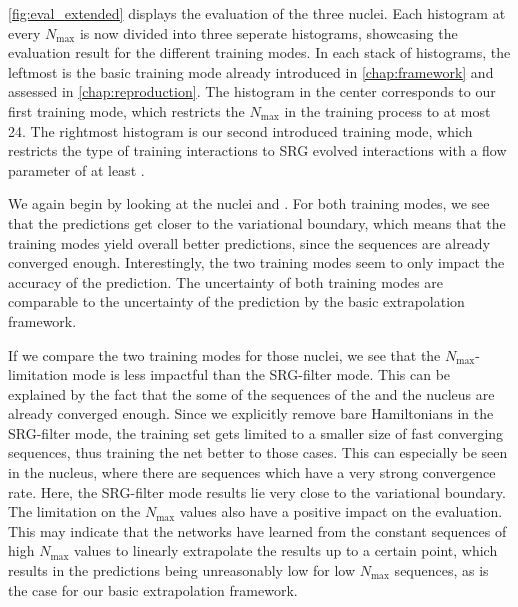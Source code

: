 \autoref{fig:eval_extended} displays the evaluation of the three nuclei. Each histogram at every $N_\mathrm{max}$ is now divided into three seperate histograms, showcasing the evaluation result for the different training modes. In each stack of histograms, the leftmost is the basic training mode already introduced in \autoref{chap:framework} and assessed in \autoref{chap:reproduction}. The histogram in the center corresponds to our first training mode, which restricts the $N_\mathrm{max}$ in the training process to at most 24. The rightmost histogram is our second introduced training mode, which restricts the type of training interactions to SRG evolved interactions with a flow parameter of at least .

We again begin by looking at the nuclei  and . For both training modes, we see that the predictions get closer to the variational boundary, which means that the training modes yield overall better predictions, since the sequences are already converged enough. Interestingly, the two training modes seem to only impact the accuracy of the prediction. The uncertainty of both training modes are comparable to the uncertainty of the prediction by the basic extrapolation framework.

If we compare the two training modes for those nuclei, we see that the $N_\mathrm{max}$-limitation mode is less impactful than the SRG-filter mode. This can be explained by the fact that the some of the sequences of the  and the  nucleus are already converged enough. Since we explicitly remove bare Hamiltonians in the SRG-filter mode, the training set gets limited to a smaller size of fast converging sequences, thus training the net better to those cases. This can especially be seen in the  nucleus, where there are sequences which have a very strong convergence rate. Here, the SRG-filter mode results lie very close to the variational boundary. The limitation on the $N_\mathrm{max}$ values also have a positive impact on the evaluation. This may indicate that the networks have learned from the constant sequences of high $N_\mathrm{max}$ values to linearly extrapolate the results up to a certain point, which results in the predictions being unreasonably low for low $N_\mathrm{max}$ sequences, as is the case for our basic extrapolation framework.

